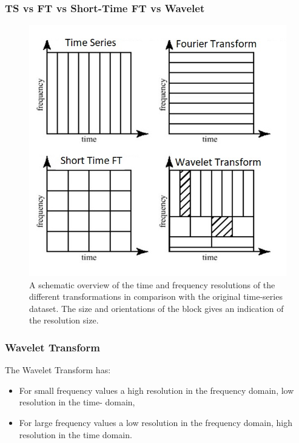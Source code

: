 \documentclass{beamer}
\begin{document}
\begin{frame}
	\frametitle{TS vs FT vs Short-Time FT vs Wavelet}
	\begin{center}
		\begin{figure}\label{fig5}
			\includegraphics[scale=0.27]{Comparisonoftransformations.jpg}
			\caption{A schematic overview of the time and frequency resolutions of the different transformations in comparison with the original time-series dataset. The size and orientations of the block gives an indication of the resolution size.}
		\end{figure}
	\end{center}

\end{frame}

\begin{frame}
	\frametitle{Wavelet Transform }
	The Wavelet Transform has:
	
	\begin{itemize}
		\item 
		For small frequency values a high resolution in the frequency domain, low resolution in the time- domain,
		
		\item
		
		For large frequency values a low resolution in the frequency domain, high resolution in the time domain.
		
	\end{itemize}

\end{frame}
\end{document}

